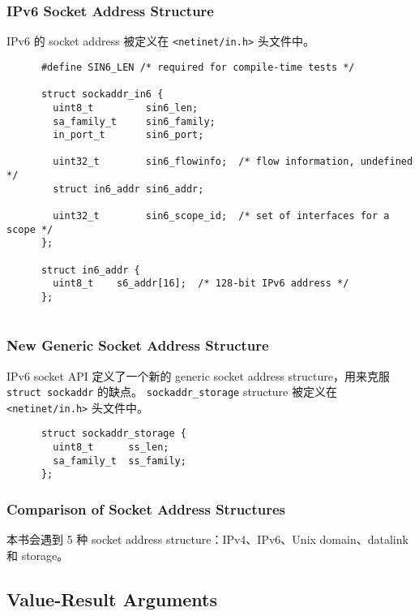     \subsubsection{IPv6 Socket Address Structure}

      IPv6 的 socket address 被定义在 \texttt{<netinet/in.h>} 头文件中。

      \begin{verbatim}
      #define SIN6_LEN /* required for compile-time tests */

      struct sockaddr_in6 {
        uint8_t         sin6_len;
        sa_family_t     sin6_family;
        in_port_t       sin6_port;

        uint32_t        sin6_flowinfo;  /* flow information, undefined */
        struct in6_addr sin6_addr;

        uint32_t        sin6_scope_id;  /* set of interfaces for a scope */
      };

      struct in6_addr {
        uint8_t    s6_addr[16];  /* 128-bit IPv6 address */
      };
        
      \end{verbatim}

    \subsubsection{New Generic Socket Address Structure}

      IPv6 socket API 定义了一个新的 generic socket address structure，用来克服 \texttt{struct sockaddr} 的缺点。
      \texttt{sockaddr\_storage} structure 被定义在 \texttt{<netinet/in.h>} 头文件中。

      \begin{verbatim}
      struct sockaddr_storage {
        uint8_t      ss_len;
        sa_family_t  ss_family;
      };
      \end{verbatim}

    \subsubsection{Comparison of Socket Address Structures}

      本书会遇到 5 种 socket address structure：IPv4、IPv6、Unix domain、datalink 和 storage。

  \subsection{Value-Result Arguments}

